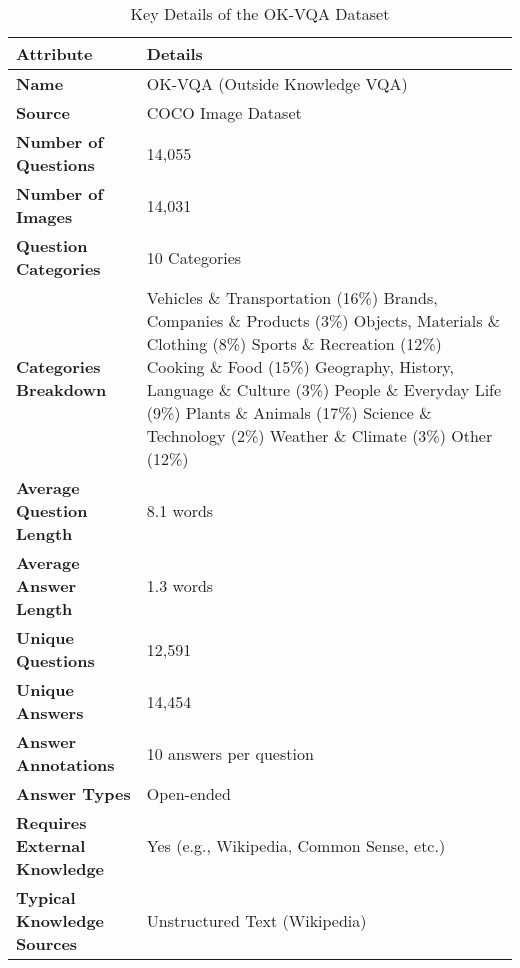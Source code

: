 \begin{table}[h!]
    \centering
    \footnotesize
    \setlength{\tabcolsep}{4pt}
    \renewcommand{\arraystretch}{1.2}
    \caption{Key Details of the OK-VQA Dataset}
    \begin{tabular}{|p{3.2cm}|p{4.8cm}|}
        \hline
        \textbf{Attribute}                & \textbf{Details} \\
        \hline
        \textbf{Name}                     & OK-VQA (Outside Knowledge VQA) \\
        \hline
        \textbf{Source}                   & COCO Image Dataset \\
        \hline
        \textbf{Number of Questions}      & 14,055 \\
        \hline
        \textbf{Number of Images}         & 14,031 \\
        \hline
        \textbf{Question Categories}      & 10 Categories \\
        \hline
        \textbf{Categories Breakdown}     & Vehicles \& Transportation (16\%) \newline Brands, Companies \& Products (3\%) \newline Objects, Materials \& Clothing (8\%) \newline Sports \& Recreation (12\%) \newline Cooking \& Food (15\%) \newline Geography, History, Language \& Culture (3\%) \newline People \& Everyday Life (9\%) \newline Plants \& Animals (17\%) \newline Science \& Technology (2\%) \newline Weather \& Climate (3\%) \newline Other (12\%) \\
        \hline
        \textbf{Average Question Length}  & 8.1 words \\
        \hline
        \textbf{Average Answer Length}    & 1.3 words \\
        \hline
        \textbf{Unique Questions}         & 12,591 \\
        \hline
        \textbf{Unique Answers}           & 14,454 \\
        \hline
        \textbf{Answer Annotations}       & 10 answers per question \\
        \hline
        \textbf{Answer Types}             & Open-ended \\
        \hline
        \textbf{Requires External Knowledge} & Yes (e.g., Wikipedia, Common Sense, etc.) \\
        \hline
        \textbf{Typical Knowledge Sources}& Unstructured Text (Wikipedia) \\
        \hline
    \end{tabular}
    \label{tab:okvqa_details}
\end{table}

